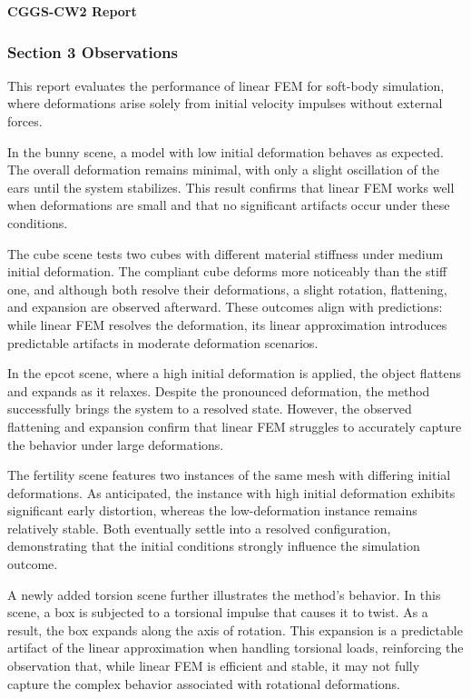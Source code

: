 \documentclass[11pt,a4paper]{article}
\begin{document}
 

{\Large \textbf{CGGS-CW2 Report}}\\
\indent {}

\subsubsection*{Section 3 Observations}

This report evaluates the performance of linear FEM for soft-body simulation, where deformations arise solely from initial velocity impulses without external forces. 

In the bunny scene, a model with low initial deformation behaves as expected. The overall deformation remains minimal, with only a slight oscillation of the ears until the system stabilizes. This result confirms that linear FEM works well when deformations are small and that no significant artifacts occur under these conditions.

The cube scene tests two cubes with different material stiffness under medium initial deformation. The compliant cube deforms more noticeably than the stiff one, and although both resolve their deformations, a slight rotation, flattening, and expansion are observed afterward. These outcomes align with predictions: while linear FEM resolves the deformation, its linear approximation introduces predictable artifacts in moderate deformation scenarios.

In the epcot scene, where a high initial deformation is applied, the object flattens and expands as it relaxes. Despite the pronounced deformation, the method successfully brings the system to a resolved state. However, the observed flattening and expansion confirm that linear FEM struggles to accurately capture the behavior under large deformations.

The fertility scene features two instances of the same mesh with differing initial deformations. As anticipated, the instance with high initial deformation exhibits significant early distortion, whereas the low-deformation instance remains relatively stable. Both eventually settle into a resolved configuration, demonstrating that the initial conditions strongly influence the simulation outcome.

A newly added torsion scene further illustrates the method’s behavior. In this scene, a box is subjected to a torsional impulse that causes it to twist. As a result, the box expands along the axis of rotation. This expansion is a predictable artifact of the linear approximation when handling torsional loads, reinforcing the observation that, while linear FEM is efficient and stable, it may not fully capture the complex behavior associated with rotational deformations.
\end{document}
